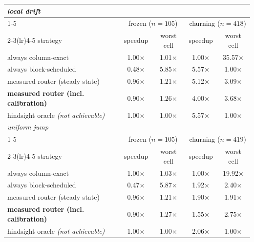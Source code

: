 \begin{tabular}{lcccc}
\toprule
\multicolumn{5}{l}{\emph{local drift}}\\
\cmidrule(lr){1-5}
& \multicolumn{2}{c}{frozen ($n{=}105$)} & \multicolumn{2}{c}{churning ($n{=}418$)}\\
\cmidrule(lr){2-3}\cmidrule(lr){4-5}
strategy & speedup & worst cell & speedup & worst cell \\
\midrule
always column-exact & 1.00$\times$ & 1.01$\times$ & 1.00$\times$ & 35.57$\times$ \\
always block-scheduled & 0.48$\times$ & 5.85$\times$ & 5.57$\times$ & 1.00$\times$ \\
measured router (steady state) & 0.96$\times$ & 1.21$\times$ & 5.12$\times$ & 3.09$\times$ \\
\textbf{measured router (incl. calibration)} & 0.90$\times$ & 1.26$\times$ & 4.00$\times$ & 3.68$\times$ \\
\midrule
hindsight oracle \emph{(not achievable)} & 1.00$\times$ & 1.00$\times$ & 5.57$\times$ & 1.00$\times$ \\
\midrule
\multicolumn{5}{l}{\emph{uniform jump}}\\
\cmidrule(lr){1-5}
& \multicolumn{2}{c}{frozen ($n{=}105$)} & \multicolumn{2}{c}{churning ($n{=}419$)}\\
\cmidrule(lr){2-3}\cmidrule(lr){4-5}
strategy & speedup & worst cell & speedup & worst cell \\
\midrule
always column-exact & 1.00$\times$ & 1.03$\times$ & 1.00$\times$ & 19.92$\times$ \\
always block-scheduled & 0.47$\times$ & 5.87$\times$ & 1.92$\times$ & 2.40$\times$ \\
measured router (steady state) & 0.96$\times$ & 1.21$\times$ & 1.90$\times$ & 1.91$\times$ \\
\textbf{measured router (incl. calibration)} & 0.90$\times$ & 1.27$\times$ & 1.55$\times$ & 2.75$\times$ \\
\midrule
hindsight oracle \emph{(not achievable)} & 1.00$\times$ & 1.00$\times$ & 2.06$\times$ & 1.00$\times$ \\
\bottomrule
\end{tabular}
